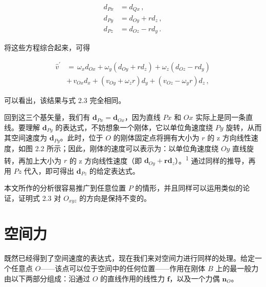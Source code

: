 \documentclass[10pt,a4paper]{book}
\theoremstyle{thmstyle} %
\theoremstyle{defstyle} %
\theoremstyle{prostyle} %
\begin{document}
$$
\begin{array}{rl} { d _ { P x } } & { { } = d _ { Q x } \, , } \\{ d _ { P y } } & { { } = d _ { O y } + r d _ { z } \, , } \\{ d _ { P z } } & { { } = d _ { O z } - r d _ { y } \, . } \end{array}
$$



将这些方程综合起来，可得



$$
\begin{array}{rl} { \hat { v } ^{\prime} } & { = \, \omega _ { x } d _ { O x } + \omega _ { y } ( d _ { O y } + r d _ { z } ) + \omega _ { z } ( d _ { O z } - r d _ { y } ) } \\& {  + \, v _ { O x } d _ { x } + ( v _ { O y } + \omega _ { z } r ) d _ { y } + ( v _ { O z } - \omega _ { y } r ) d _ { z } \, , } \end{array}
$$



可以看出，该结果与式 2.3 完全相同。



回到这三个基矢量，我们有 $\mathbf{d}_{Px} = \mathbf{d}_{Ox}$，因为直线 $Px$ 和 $Ox$ 实际上是同一条直线。要理解 $\mathbf{d}_{Py}$ 的表达式，不妨想象一个刚体，它以单位角速度绕 $Py$ 旋转，从而其空间速度为 $\mathbf{d}_{Py}$。此时，位于 $O$ 的刚体固定点将拥有大小为 $r$ 的 z 方向线性速度，如图 2.2 所示；因此，刚体的速度可以表示为：以单位角速度绕 $Oy$ 直线旋转，再加上大小为 $r$ 的 z 方向线性速度（即 $\mathbf{d}_{Oy} + \mathbf{r} \mathbf{d}_z$）。\textsuperscript{1} 通过同样的推导，再用 $Pz$ 代入，即可得出 $\mathbf{d}_{Pz}$ 的给定表达式。



本文所作的分析很容易推广到任意位置 $P$ 的情形，并且同样可以运用类似的论证，证明式 2.3 对 $O_{xyz}$ 的方向是保持不变的。



\section{空间力}





既然已经得到了空间速度的表达式，现在我们来对空间力进行同样的处理。给定一个任意点 $O$——该点可以位于空间中的任何位置——作用在刚体 $B$ 上的最一般力由以下两部分组成：沿通过 $O$ 的直线作用的线性力 $\boldsymbol{f}$，以及一个力偶 $\boldsymbol{n}_O$。
\end{document}
